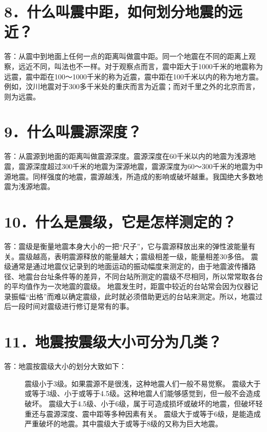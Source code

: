 \documentclass[a4paper,12pt,english]{sphinxmanual}
\begin{document}
\section{8．什么叫震中距，如何划分地震的远近？}
\label{\detokenize{index:id10}}
答：从震中到地面上任何一点的距离叫做震中距。同一个地震在不同的距离上观察，远近不同，叫法也不一样。对于观察点而言，震中距大于1000千米的地震称为远震，震中距在100～1000千米的称为近震，震中距在100千米以内的称为地方震。例如，汶川地震对于300多千米处的重庆而言为近震；而对千里之外的北京而言，则为远震。


\section{9．什么叫震源深度？}
\label{\detokenize{index:id11}}
答：从震源到地面的距离叫做震源深度。震源深度在60千米以内的地震为浅源地震，震源深度超过300千米的地震为深源地震，震源深度为60～300千米的地震为中源地震。同样强度的地震，震源越浅，所造成的影响或破坏越重。我国绝大多数地震为浅源地震。


\section{10．什么是震级，它是怎样测定的？}
\label{\detokenize{index:id12}}
答：震级是衡量地震本身大小的一把“尺子”，它与震源释放出来的弹性波能量有关。震级越高，表明震源释放的能量越大；震级相差一级，能量相差30多倍。
震级通常是通过地震仪记录到的地面运动的振动幅度来测定的，由于地震波传播路径、地震台台址条件等的差异，不同台站所测定的震级不尽相同，所以常常取各台的平均值作为一次地震的震级。
地震发生时，距震中较近的台站常会因为仪器记录振幅“出格”而难以确定震级，此时就必须借助更远的台站来测定。所以，地震过后一段时间对震级进行修订是常有的事。


\section{11．地震按震级大小可分为几类？}
\label{\detokenize{index:id13}}\begin{description}
\item[{答：地震按震级大小的划分大致如下：}] \leavevmode
{} 震级小于3级。如果震源不是很浅，这种地震人们一般不易觉察。
 震级大于或等于3级、小于或等于4.5级。这种地震人们能够感觉到，但一般不会造成破坏。
 震级大于4.5级、小于6级，属于可造成损坏或破坏的地震，但破坏轻重还与震源深度、震中距等多种因素有关。
 震级大于或等于6级，是能造成严重破坏的地震。其中震级大于或等于8级的又称为巨大地震。

\end{description}
\end{document}

